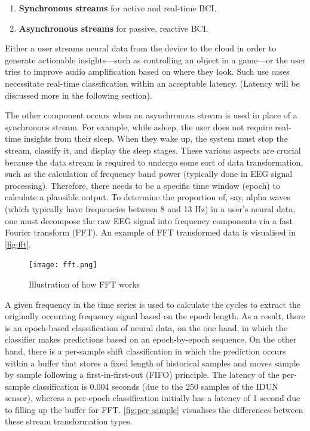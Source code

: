 \begin{enumerate}
  \item \textbf{Synchronous streams} for active and real-time BCI.
  \item \textbf{Asynchronous streams} for passive, reactive BCI.
\end{enumerate}

Either a user streams neural data from the device to the cloud in order to generate actionable insights—such as controlling an object in a game—or the user tries to improve audio amplification based on where they look. Such use cases necessitate real-time classification within an acceptable latency. (Latency will be discussed more in the following section).

The other component occurs when an asynchronous stream is used in place of a synchronous stream. For example, while asleep, the user does not require real-time insights from their sleep. When they wake up, the system must stop the stream, classify it, and display the sleep stages. These various aspects are crucial because the data stream is required to undergo some sort of data transformation, such as the calculation of frequency band power (typically done in EEG signal processing). Therefore, there needs to be a specific time window (epoch) to calculate a plausible output. To determine the proportion of, say, alpha waves (which typically have frequencies between 8 and 13 Hz) in a user’s neural data, one must decompose the raw EEG signal into frequency components via a fast Fourier transform (FFT). An example of FFT transformed data is visualised in  \autoref{fig:fft}.

\begin{figure}[!ht]
  \centering
  \texttt{[image: fft.png]}
  \caption[Illustration of how FFT works]{Illustration of how FFT works \citep{3blue1brown_but_2018}}
  \label{fig:fft}
\end{figure}

A given frequency in the time series is used to calculate the cycles to extract the originally occurring frequency signal based on the epoch length. As a result, there is an epoch-based classification of neural data, on the one hand, in which the classifier makes predictions based on an epoch-by-epoch sequence. On the other hand, there is a per-sample shift classification in which the prediction occurs within a buffer that stores a fixed length of historical samples and moves sample by sample following a first-in-first-out (FIFO) principle. The latency of the per-sample classification is 0.004 seconds (due to the 250 samples of the IDUN sensor), whereas a per-epoch classification initially has a latency of 1 second due to filling up the buffer for FFT. \autoref{fig:per-sample} visualises the differences between these stream transformation types.

